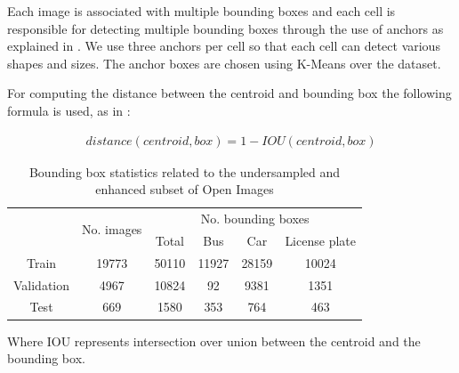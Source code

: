     Each image is associated with multiple bounding boxes and each cell is responsible for detecting multiple bounding boxes through the use of anchors as explained in \cite{yolov2}. We use three anchors per cell so that each cell can detect various shapes and sizes. The anchor boxes are chosen using K-Means over the dataset.

    
    For computing the distance between the centroid and bounding box the following formula is used, as in \cite{yolov2}:
    
    \begin{gather*}
        distance(centroid, box) = 1-IOU(centroid, box)
    \end{gather*}
    
    \begin{table}[!b]
    \centering
    \caption{Bounding box statistics related to the undersampled and enhanced subset of Open Images}
    \begin{tabular}{|c|c|cccc|}
    \hline
    \multirow{2}{*}{} & \multirow{2}{*}{No. images} & \multicolumn{4}{c|}{No. bounding boxes}                                                    \\ \cline{3-6} 
                      &                                   & \multicolumn{1}{c|}{Total} & \multicolumn{1}{c|}{Bus} & \multicolumn{1}{c|}{Car} & License plate \\ \hline
    Train      & 19773 & \multicolumn{1}{c|}{50110} & \multicolumn{1}{c|}{11927} & \multicolumn{1}{c|}{28159} & 10024 \\ \hline
    Validation & 4967  & \multicolumn{1}{c|}{10824} & \multicolumn{1}{c|}{92}    & \multicolumn{1}{c|}{9381}  & 1351  \\ \hline
    Test              & 669                               & \multicolumn{1}{c|}{1580}  & \multicolumn{1}{c|}{353} & \multicolumn{1}{c|}{764} & 463           \\ \hline
    \end{tabular}
    \label{enhanced_dataset}
    
    \end{table}
    
    
    Where IOU represents intersection over union between the centroid and the bounding box.
    
    
